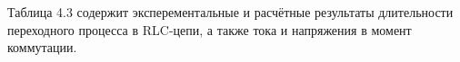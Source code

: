 Таблица 4.3 содержит эксперементальные и расчётные результаты длительности переходного процесса в RLC-цепи, а также тока и напряжения в момент коммутации.

\begin{table}[h]
	\centering
	\caption{Результаты измерений и расчётов для апериодического процесса}
\end{table}
